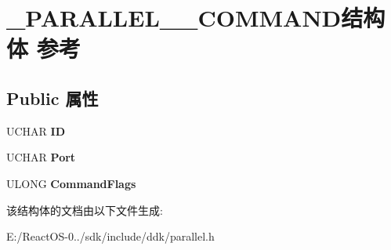 \hypertarget{struct___p_a_r_a_l_l_e_l__1284___c_o_m_m_a_n_d}{}\section{\+\_\+\+P\+A\+R\+A\+L\+L\+E\+L\+\_\+\_\+\+C\+O\+M\+M\+A\+N\+D结构体 参考}
\label{struct___p_a_r_a_l_l_e_l__1284___c_o_m_m_a_n_d}
\subsection*{Public 属性}
\begin{DoxyCompactItemize}
\item 
\mbox{\label{struct___p_a_r_a_l_l_e_l__1284___c_o_m_m_a_n_d_a2ef26ac4bceee027ed82ba68d0f92f63}} 
U\+C\+H\+AR {\bfseries ID}
\item 
\mbox{\label{struct___p_a_r_a_l_l_e_l__1284___c_o_m_m_a_n_d_ae26b8b4c69b5759eacbed86e515e310f}} 
U\+C\+H\+AR {\bfseries Port}
\item 
\mbox{\label{struct___p_a_r_a_l_l_e_l__1284___c_o_m_m_a_n_d_a6f3d78cbd9140f5dd379a5c34163b956}} 
U\+L\+O\+NG {\bfseries Command\+Flags}
\end{DoxyCompactItemize}


该结构体的文档由以下文件生成\+:\begin{DoxyCompactItemize}
\item 
E\+:/\+React\+O\+S-\/0../sdk/include/ddk/parallel.\+h\end{DoxyCompactItemize}
